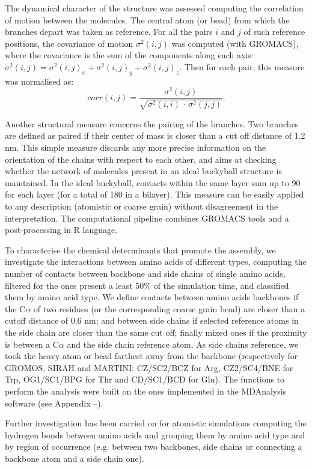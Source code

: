 The dynamical character of the structure was assessed computing the correlation of motion between the molecules. The central atom (or bead) from which the branches depart was taken as reference. For all the pairs $i$ and $j$ of such reference positions, the covariance of motion $\sigma^2(i,j)$ was computed (with GROMACS), where the covariance is the sum of the components along each axis: $\sigma^2(i,j) = \sigma^2(i,j)_x + \sigma^2(i,j)_y + \sigma^2(i,j)_z$. Then for each pair, this measure was normalised as:
\begin{equation}
corr(i,j) = \frac{\sigma^2(i,j)}{\sqrt{\sigma^2(i,i)\,\cdot\,\sigma^2(j,j)}}.
\end{equation}

Another structural measure concerns the pairing of the branches. Two branches are defined as paired if their center of mass is closer than a cut off distance of 1.2 nm. This simple measure discards any more precise information on the orientation of the chains with respect to each other, and aims at checking whether the network of molecules present in an ideal buckyball structure is maintained. In the ideal buckyball, contacts within the same layer sum up to 90 for each layer (for a total of 180 in a bilayer). This measure can be easily applied to any description (atomistic or coarse grain) without disagreement in the interpretation. The computational pipeline combines GROMACS tools and a post-processing in R language.

To characterise the chemical determinants that promote the assembly, we investigate the interactions between amino acids of different types, computing the number of contacts between backbone and side chains of single amino acids, filtered for the ones present a least 50\% of the simulation time, and classified them by amino acid type.
%
We define contacts between amino acids backbones if the C$\alpha$ of two residues (or the corresponding coarse grain bead) are closer than a cutoff distance of 0.6 nm; and between side chains if selected reference atoms in the side chain are closer than the same cut off; finally mixed ones if the proximity is between a C$\alpha$ and the side chain reference atom. As side chains reference, we took the heavy atom or bead farthest away from the backbone (respectively for GROMOS, SIRAH and MARTINI: CZ/SC2/BCZ for Arg, CZ2/SC4/BNE for Trp, OG1/SC1/BPG for Thr and CD/SC1/BCD for Glu). The functions to perform the analysis were built on the ones implemented in the MDAnalysis software (see Appendix --).

Further investigation has been carried on for atomistic simulations computing the hydrogen bonds between amino acids and grouping them by amino acid type and by region of occurrence (e.g. between two backbones, side chains or connecting a backbone atom and a side chain one).

